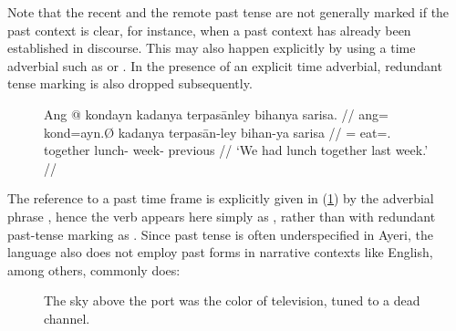 Note that the recent and the remote past tense are not generally marked if the 
past context is clear, for instance, when a past context has already been 
established in discourse. This may also happen explicitly by using a time 
adverbial such as  or . In the presence of an 
explicit time adverbial, redundant tense marking is also dropped subsequently.

\begin{figure}
\ex\label{ex:pstnopst}\begingl
	\gla Ang @ kondayn kadanya terpasānley bihanya sarisa. //
	\glb ang= kond=ayn.Ø kadanya terpasān-ley bihan-ya sarisa //
	\glc \AgtT{}= eat=\Fpl{}.\Top{} together lunch-\PargI{} week-\Loc{}
		previous //
	\glft `We had lunch together last week.' //
\endgl\xe
\end{figure}

The reference to a past time frame is explicitly given in (\ref{ex:pstnopst})
by the adverbial phrase , hence
the verb appears here simply as , rather than with
redundant past-tense marking as . Since past tense is
often underspecified in Ayeri, the language also does not employ past forms in
narrative contexts like English, among others, commonly does:

\begin{figure}[h!]
\ex\label{ex:neuromancer}
	The sky above the port was the color of television, tuned to a dead 
	channel. 
\xe
\end{figure}

